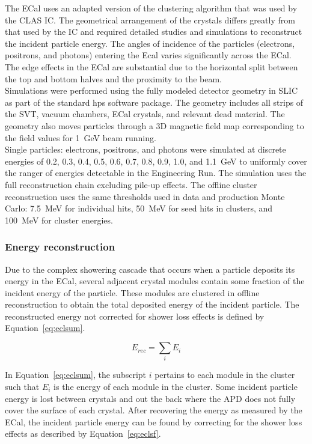 The ECal uses an adapted version of the clustering algorithm that was used by the CLAS IC. The geometrical arrangement of the crystals differs greatly from that used by the IC and required detailed studies and simulations to reconstruct the incident particle energy. The angles of incidence of the particles (electrons, positrons, and photons) entering the Ecal varies significantly across the ECal. The edge effects in the ECal are substantial due to the horizontal split between the top and bottom halves and  the proximity to the beam. \\
\indent Simulations were performed using the fully modeled detector geometry in SLIC as part of the standard hps software package. The geometry includes all strips of the SVT, vacuum chambers, ECal crystals, and relevant dead material. The geometry also moves particles through a 3D magnetic field map corresponding to the field values for 1~GeV beam running.~\cite{szumila-vance_hps_2016} \\
\indent Single particles: electrons, positrons, and photons were simulated at discrete energies of 0.2, 0.3, 0.4, 0.5, 0.6, 0.7, 0.8,  0.9, 1.0, and 1.1~GeV to uniformly cover the ranger of energies detectable in the Engineering Run. The simulation uses the full reconstruction chain excluding pile-up effects. The offline cluster reconstruction uses the same thresholds used in data and production Monte Carlo: 7.5~MeV for individual hits, 50~MeV for seed hits in clusters, and 100~MeV for cluster energies.\\

\subsubsection{Energy reconstruction}
\indent Due to the complex showering cascade that occurs when a particle deposits its energy in the ECal, several adjacent crystal modules contain some fraction of the incident energy of the particle. These modules are clustered in offline reconstruction to obtain the total deposited energy of the incident particle. The reconstructed energy not corrected for shower loss effects is defined by Equation~\eqref{eq:eclsum}.

\begin{equation}
\label{eq:eclsum}
E_{rec} = \sum_i E_i    
\end{equation}

In Equation~\eqref{eq:eclsum}, the subscript $i$ pertains to each module in the cluster such that $E_i$ is the energy of each module in the cluster. Some incident particle energy is lost between crystals and out the back where the APD does not fully cover the surface of each crystal. After recovering the energy as measured by the ECal, the incident particle energy can be found by correcting for the shower loss effects as described by Equation~\eqref{eq:eclsf}.

